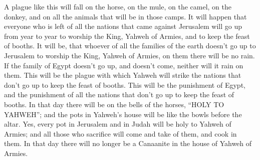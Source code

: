 {\par }{\PP {}A plague like this will fall on the horse, on the mule, on the camel, on the donkey, and on all the animals that will be in those camps.
It will happen that everyone who is left of all the nations that came against Jerusalem will go up from year to year to worship the King, Yahweh of Armies, and to keep the feast of booths.
It will be, that whoever of all the families of the earth doesn’t go up to Jerusalem to worship the King, Yahweh of Armies, on them there will be no rain.
If the family of Egypt doesn’t go up, and doesn’t come, neither will it rain on them. This will be the plague with which Yahweh will strike the nations that don’t go up to keep the feast of booths.
This will be the punishment of Egypt, and the punishment of all the nations that don’t go up to keep the feast of booths.
In that day there will be on the bells of the horses, “HOLY TO YAHWEH”; and the pots in Yahweh’s house will be like the bowls before the altar.
Yes, every pot in Jerusalem and in Judah will be holy to Yahweh of Armies; and all those who sacrifice will come and take of them, and cook in them. In that day there will no longer be a Canaanite in the house of Yahweh of Armies.
\par }
